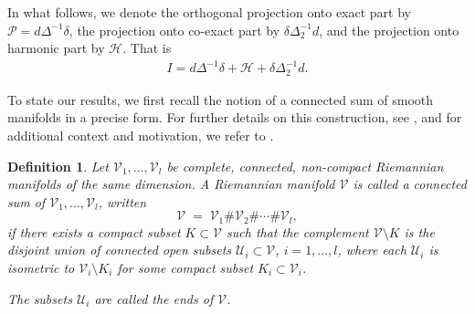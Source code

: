 \documentclass[12pt]{amsart}
\newtheorem{definition}[theorem]{Definition}
\begin{document}
In what follows, we denote the orthogonal projection onto exact part by $\mathcal{P} = d \Delta^{-1} \delta$, the projection onto co-exact part by $\delta \Delta_2^{-1}d$, and the projection onto harmonic part by $\mathcal{H}$. That is
\begin{align*}
    I = d \Delta^{-1} \delta +\mathcal{H} + \delta \Delta_2^{-1} d.
\end{align*}



To state our results, we first recall the notion of a connected sum of smooth manifolds in a precise form. For further details on this construction, see \cite{GS,GIS}, and for additional context and motivation, we refer to \cite{Davies_nongaussian}.

\begin{definition}\label{def:connected-sum}
Let $\mathcal{V}_1, \ldots, \mathcal{V}_l$ be complete, connected, non-compact Riemannian manifolds of the same dimension.  
A Riemannian manifold $\mathcal{V}$ is called a \emph{connected sum} of $\mathcal{V}_1, \ldots, \mathcal{V}_l$, written
\[
\mathcal{V} \;=\; \mathcal{V}_1 \# \mathcal{V}_2 \# \cdots \# \mathcal{V}_l,
\]
if there exists a compact subset $K \subset \mathcal{V}$ such that the complement $\mathcal{V} \setminus K$ is the disjoint union of connected open subsets $\mathcal{U}_i \subset \mathcal{V}$, $i=1,\ldots,l$, where each $\mathcal{U}_i$ is isometric to $\mathcal{V}_i \setminus K_i$ for some compact subset $K_i \subset \mathcal{V}_i$.

The subsets $\mathcal{U}_i$ are called the \emph{ends} of $\mathcal{V}$.
\end{definition}





\end{document}

